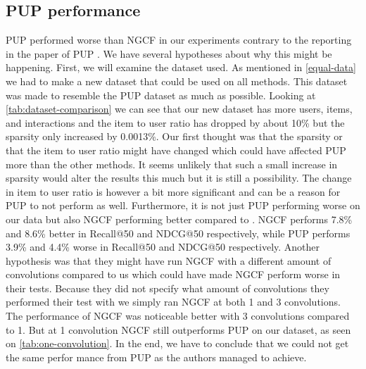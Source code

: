 \subsection{PUP performance}
PUP performed worse than NGCF in our experiments contrary to the reporting in the paper of PUP \cite{Priceaware}.
We have several hypotheses about why this might be happening.
First, we will examine the dataset used.
As mentioned in \autoref{equal-data} we had to make a new dataset that could be used on all methods.
This dataset was made to resemble the PUP dataset as much as possible.
Looking at \autoref{tab:dataset-comparison} we can see that our new dataset has more users, items, and interactions and the item to user ratio has dropped by about 10\% but the sparsity only increased by 0.0013\%.
Our first thought was that the sparsity or that the item to user ratio might have changed which could have affected PUP more than the other methods.
It seems unlikely that such a small increase in sparsity would alter the results this much but it is still a possibility.
The change in item to user ratio is however a bit more significant and can be a reason for PUP to not perform as well.
Furthermore, it is not just PUP performing worse on our data but also NGCF performing better compared to \cite{Priceaware}.
NGCF performs 7.8\% and 8.6\% better in Recall@50 and NDCG@50 respectively, while PUP performs 3.9\% and 4.4\% worse in Recall@50 and NDCG@50 respectively.
Another hypothesis was that they might have run NGCF with a different amount of convolutions compared to us which could have made NGCF perform worse in their tests.
Because they did not specify what amount of convolutions they performed their test with we simply ran NGCF at both 1 and 3 convolutions.
The performance of NGCF was noticeable better with 3 convolutions compared to 1.
But at 1 convolution NGCF still outperforms PUP on our dataset, as seen on \autoref{tab:one-convolution}.
In the end, we have to conclude that we could not get the same perfor   mance from PUP as the authors managed to achieve.
